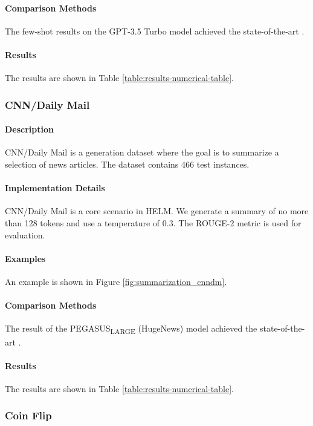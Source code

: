\paragraph{Comparison Methods}
The few-shot results on the GPT-3.5 Turbo model achieved the state-of-the-art \citep{liang2022holistic}.

\paragraph{Results} The results are shown in Table \ref{table:results-numerical-table}.

\subsubsection{CNN/Daily Mail} 
\paragraph{Description} CNN/Daily Mail \citep{see2017point} is a generation dataset where the goal is to summarize a selection of news articles. The dataset contains 466 test instances.

\paragraph{Implementation Details}
CNN/Daily Mail is a core scenario in HELM. We generate a summary of no more than 128 tokens and use a temperature of 0.3. The ROUGE-2 metric is used for evaluation.

\paragraph{Examples} An example is shown in Figure \ref{fig:summarization_cnndm}.

\paragraph{Comparison Methods}
The result of the PEGASUS\textsubscript{LARGE} (HugeNews) model achieved the state-of-the-art \citep{zhang2020pegasus}.

\paragraph{Results} The results are shown in Table \ref{table:results-numerical-table}.

\subsubsection{Coin Flip}
